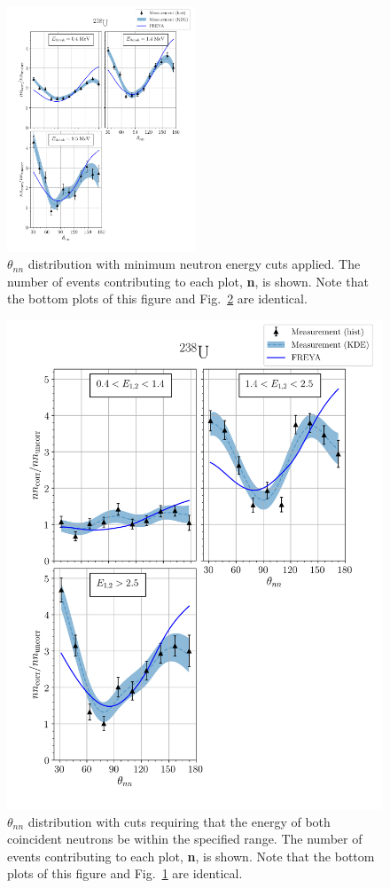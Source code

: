 \begin{figure}
\centering
    \includegraphics[width = 0.5\textwidth]{FinalDUResultw_freya0KDE.png}
    \caption{$\theta_{nn}$ distribution with minimum neutron energy cuts applied.
    The number of events contributing to each plot, \textbf{n}, is shown. Note that the bottom plots of this figure and Fig.~\ref{fig:DU(2)} are identical.}
    \label{fig:DU(0)}
\end{figure}
\begin{figure}
\centering
    \includegraphics[width = \figsize\textwidth]{FinalDUResultw_freya2KDE.png}
    \caption{ $\theta_{nn}$ distribution with cuts requiring that the energy of both coincident neutrons be within the specified range.
    The number of events contributing to each plot, \textbf{n}, is shown. Note that the bottom plots of this figure and Fig.~\ref{fig:DU(0)} are identical.}
    \label{fig:DU(2)}
\end{figure}

